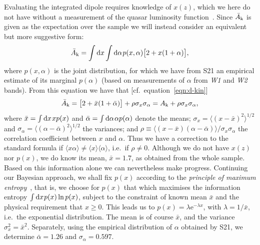 \documentclass[fleqn,usenatbib]{mnras}
\def\ssp{\hspace{0.09em}}
\def\sp{\hspace{0.06em}}
\def\rme{\mathrm{e}}
\def\be{\begin{equation}}\def\ee{\end{equation}}
\def\mid{\,|\,}
\def\dif{\mathrm{d}}
\def\delD{\delta_\mathrm{D}}
\def\kin{{\rm k}}
\def\ckin{A_\kin}
\begin{document}
Evaluating the integrated dipole requires knowledge of
$x(z)$, which we here do not have without a measurement of the quasar
luminosity function~\citep{2020MNRAS.499.2598W,2022arXiv221204925G}.
Since $\bar{A}_\kin$ is given as the expectation
over the sample we will instead consider an equivalent but more suggestive form:
\be\label{eqn:d-kin-alt}
\bar{A}_\kin=\int\dif x\int\dif\alpha\ssp
p(x,\alpha)\big[2+x(1+\alpha)\big],
\ee
where $p(x,\alpha)$ is the joint distribution, for
which we have from S21 an empirical estimate of its marginal $p(\alpha)$ (based on  measurements of
$\alpha$ from {\it W1} and {\it W2} bands).
From this equation we have that [cf.~equation~\eqref{eqn:d-kin}]
\be\label{eqn:d-kin-corr}
\bar{A}_\kin
=\big[2+\bar{x}(1+\bar\alpha)\big]
    +\rho\sigma_x\sigma_\alpha
=\ckin+\rho\sigma_x\sigma_\alpha,
\ee
where $\bar{x}=\int\dif x\ssp xp(x)$ and
$\bar\alpha=\int\dif\alpha\ssp \alpha p(\alpha)$ denote the means;
$\sigma_x=\langle(x-\bar{x})^2\rangle^{1/2}$ and
$\sigma_\alpha=\langle(\alpha-\bar{\alpha})^2\rangle^{1/2}$ the variances;
and $\rho\equiv\langle(x-\bar{x})(\alpha-\bar{\alpha})\rangle/\sigma_x\sigma_\alpha$ the correlation coefficient between $x$ and $\alpha$.
Thus we have a correction to the standard formula
if $\langle x\alpha\rangle\neq\langle x\rangle\langle\alpha\rangle$, i.e.~if $\rho\neq0$.
Although we do not have $x(z)$ nor $p(x)$, we do know
its mean, $\bar{x}=1.7$, as obtained from the whole sample.
Based on this information alone we can nevertheless make
progress.
Continuing our Bayesian approach, we shall fix $p(x)$ according
to the \emph{principle of maximum entropy}~\citep{Jaynes_book},
that is, we choose for $p(x)$ that which maximises
the information entropy $\int\dif x\sp p(x)\ln p(x)$, subject
to the constraint of known mean $\bar{x}$
and the physical requirement that $x\geq0$. This leads us
to $p(x)=\lambda\rme^{-\lambda x}$, with $\lambda=1/\bar{x}$,
i.e.~the exponential distribution.
The mean is of course $\bar{x}$, and the variance
$\sigma_x^2=\bar{x}^2$.
Separately, using the empirical distribution of $\alpha$
obtained by S21, we determine $\bar\alpha=1.26$ and
$\sigma_\alpha=0.597$.
\end{document}
